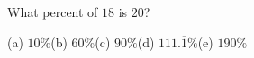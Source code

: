 What percent of $18$ is $20$?

(a) $10\%$\quad (b) $60\%$\quad (c) $90\%$\quad (d) $111.\overline{1}\%$\quad (e) $190\%$
